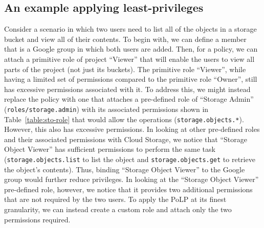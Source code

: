 \subsection{An example applying least-privileges}
Consider a scenario in which two users need to list all of the objects in a storage bucket and view all of their contents.  To
begin with, we can define a member that is a Google group in which both users are added.  Then, for a policy, we can attach
a primitive role of project ``Viewer'' that will enable the users to view all parts of the project (not just its buckets).
The primitive role ``Viewer'', while having a limited set of permissions compared to the
primitive role ``Owner'', still has excessive permissions associated with it.
To address this, we might instead replace the policy with one that
attaches a pre-defined role of ``Storage Admin'' ({\tt roles/storage.admin}) with its associated permissions shown in Table~\ref{table:sto-role}
that would allow the operations ({\tt storage.objects.*}).  However, this also has excessive 
permissions. In looking at other pre-defined roles and
their associated permissions with Cloud Storage, we notice that ``Storage Object Viewer'' has sufficient permissions
to perform the same task ({\tt storage.objects.list} to list the object and {\tt storage.objects.get} to retrieve the object's
contents). Thus, binding ``Storage Object Viewer''
to the Google group would further reduce privileges.  In looking at the ``Storage Object Viewer'' pre-defined role, however, we notice
that it provides two additional permissions that are not required by the two users.  To apply the PoLP at its finest granularity,
we can instead create a custom role and attach only the two permissions required.